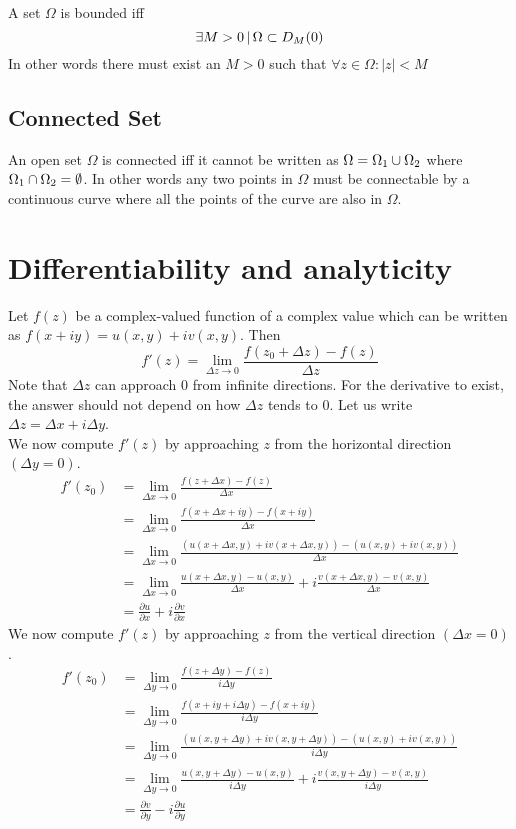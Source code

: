 \documentclass{article}
\begin{document}
A set \(\Omega\) is bounded iff
\[
    \exists M>0 \,|\, \Omega \subset D_M(0)
\]
In other words there must exist an \(M>0\) such that \(\forall z\in \Omega:|z|<M\)

\subsection{Connected Set}

An open set \(\Omega\) is connected iff it cannot be written as
\(\Omega=\Omega_1 \cup \Omega_2\) where \(\Omega_1 \cap \Omega_2 = \emptyset\).
In other words any two points in \(\Omega\) must be connectable by a continuous
curve where all the points of the curve are also in \(\Omega\).


\pagebreak

\section{Differentiability and analyticity}

Let \(f(z)\) be a complex-valued function
of a complex value which can be written as
\(f(x+iy)=u(x,y)+iv(x,y)\). Then
\[
    f'(z) = \lim_{\Delta z \to 0} \frac{f(z_0 + \Delta z)-f(z)}{\Delta z}
\]
Note that \(\Delta z\) can approach \(0\) from
infinite directions.
For the derivative to exist, the answer
should not depend on how \(\Delta z\) tends to 0.
Let us write \(\Delta z = \Delta x + i\Delta y\). \\
We now compute \(f'(z)\) by approaching \(z\) from the
horizontal direction \((\Delta y=0)\).
\begin{align*}
    f'(z_0) &= \lim_{\Delta x \to 0} \frac{f(z + \Delta x) - f(z)}{\Delta x} \\
    &= \lim_{\Delta x \to 0}
        \frac{f(x + \Delta x + iy) - f(x + iy)}{\Delta x} \\
    &= \lim_{\Delta x \to 0}
        \frac{(u(x + \Delta x, y) + iv(x + \Delta x, y)) - (u(x,y)+iv(x,y))}{\Delta x} \\
    &= \lim_{\Delta x \to 0}
        \frac{u(x + \Delta x, y) - u(x,y)}{\Delta x} + i\frac{v(x + \Delta x, y) - v(x,y)}{\Delta x} \\
    &= \frac{\partial u}{\partial x} + i \frac{\partial v}{\partial x}
\end{align*}
We now compute \(f'(z)\) by approaching \(z\) from the
vertical direction \((\Delta x=0)\).
\begin{align*}
    f'(z_0) &= \lim_{\Delta y \to 0} \frac{f(z + \Delta y) - f(z)}{i\Delta y} \\
    &= \lim_{\Delta y \to 0}
        \frac{f(x + iy + i\Delta y) - f(x + iy)}{i\Delta y} \\
    &= \lim_{\Delta y \to 0}
        \frac{(u(x, y + \Delta y) + iv(x, y + \Delta y)) - (u(x,y)+iv(x,y))}{i\Delta y} \\
    &= \lim_{\Delta y \to 0}
        \frac{u(x, y + \Delta y) - u(x,y)}{i\Delta y} + i\frac{v(x, y + \Delta y) - v(x,y)}{i\Delta y} \\
    &= \frac{\partial v}{\partial y} -i\frac{\partial u}{\partial y}
\end{align*}
\end{document}
